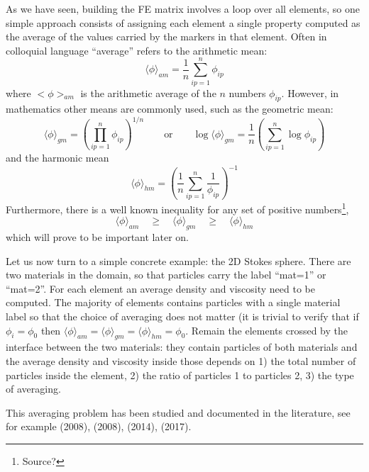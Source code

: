 As we have seen, building the FE matrix involves a loop over all elements, 
so one simple approach consists of assigning each element a single property
computed as the average of the values carried by the markers in that element. 
Often in colloquial language ``average'' refers to the arithmetic mean: 
\begin{equation}
\langle \phi \rangle_{am}=\frac{1}{n} \sum_{ip=1}^n \phi_{ip} 
\end{equation}
where $<\phi>_{am}$ is the arithmetic average of the $n$ numbers $\phi_{ip}$. 
However, in mathematics other means are commonly used, such as the geometric mean: 
\begin{equation}
\langle \phi \rangle_{gm}=\left( \prod_{ip=1}^n \phi_{ip} \right)^{1/n}
\qquad
\text{or}
\qquad
\log \langle \phi \rangle_{gm}= \frac{1}{n} \left( \sum_{ip=1}^n \log \phi_{ip} \right)
\end{equation}
and the harmonic mean
\begin{equation}
\langle \phi \rangle_{hm}=\left( \frac{1}{n} \sum_{ip=1}^n \frac{1}{\phi_{ip}} \right)^{-1}
\end{equation}
Furthermore, there is a well known inequality for any set of positive numbers\footnote{Source?},
\begin{equation}
\langle \phi \rangle_{am}\quad  \geq \quad
\langle \phi \rangle_{gm}\quad  \geq \quad
\langle \phi \rangle_{hm} 
\end{equation}
which will prove to be important later on. 

Let us now turn to a simple concrete example: the 2D Stokes sphere. 
There are two materials in the domain, so that particles carry the label ``mat=1'' or ``mat=2''.
For each element an average density and viscosity need to be computed. 
The majority of elements contains particles
with a single material label so that the choice of averaging does not matter (it is trivial to verify that 
if $\phi_i=\phi_0$ then $\langle \phi \rangle_{am}=\langle \phi \rangle_{gm}=\langle \phi \rangle_{hm}=\phi_0$.
Remain the elements crossed by the interface between the two materials: they contain particles of both materials
and the average density and viscosity inside those depends on 1) the total number of particles inside the element, 
2) the ratio of particles 1 to particles 2, 3) the type of averaging. 

This averaging problem has been studied and documented in the literature, see
for example 
\textcite{scbe08} (2008), \textcite{deka08} (2008), \textcite{thmk14} (2014), 
\textcite{pukp17} (2017).

